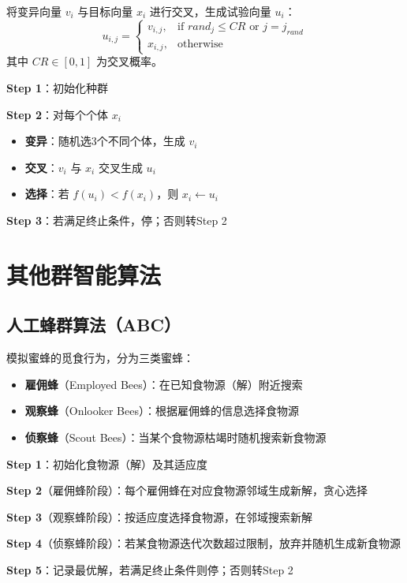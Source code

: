 \begin{definition}[DE的交叉操作]
将变异向量 $v_i$ 与目标向量 $x_i$ 进行交叉，生成试验向量 $u_i$：
\[
u_{i,j} = \begin{cases} v_{i,j}, & \text{if } rand_j \leq CR \text{ or } j = j_{rand} \\ x_{i,j}, & \text{otherwise} \end{cases}
\]
其中 $CR \in [0, 1]$ 为交叉概率。
\end{definition}

\begin{algobox}[DE算法]
\textbf{Step 1}：初始化种群

\textbf{Step 2}：对每个个体 $x_i$
\begin{itemize}
    \item \textbf{变异}：随机选3个不同个体，生成 $v_i$
    \item \textbf{交叉}：$v_i$ 与 $x_i$ 交叉生成 $u_i$
    \item \textbf{选择}：若 $f(u_i) < f(x_i)$，则 $x_i \leftarrow u_i$
\end{itemize}

\textbf{Step 3}：若满足终止条件，停；否则转Step 2
\end{algobox}

\section{其他群智能算法}\label{sec:swarm-intelligence}

\subsection{人工蜂群算法（ABC）}

\begin{conceptbox}[ABC原理]
模拟蜜蜂的觅食行为，分为三类蜜蜂：
\begin{itemize}[itemsep=0.3em]
    \item \textbf{雇佣蜂}（Employed Bees）：在已知食物源（解）附近搜索
    \item \textbf{观察蜂}（Onlooker Bees）：根据雇佣蜂的信息选择食物源
    \item \textbf{侦察蜂}（Scout Bees）：当某个食物源枯竭时随机搜索新食物源
\end{itemize}
\end{conceptbox}

\begin{algobox}[ABC算法]
\textbf{Step 1}：初始化食物源（解）及其适应度

\textbf{Step 2}（雇佣蜂阶段）：每个雇佣蜂在对应食物源邻域生成新解，贪心选择

\textbf{Step 3}（观察蜂阶段）：按适应度选择食物源，在邻域搜索新解

\textbf{Step 4}（侦察蜂阶段）：若某食物源迭代次数超过限制，放弃并随机生成新食物源

\textbf{Step 5}：记录最优解，若满足终止条件则停；否则转Step 2
\end{algobox}

